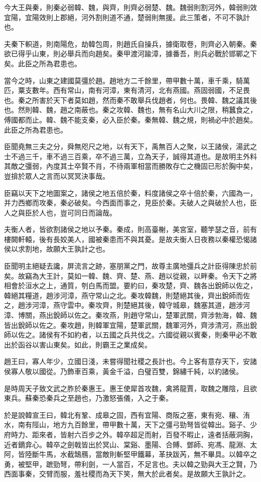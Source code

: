 今大王與秦，則秦必弱韓、魏，與齊，則齊必弱楚、魏。魏弱則割河外，韓弱則效宜陽，宜陽效則上郡絕，河外割則道不通，楚弱則無援。此三策者，不可不孰計也。

夫秦下軹道，則南陽危，劫韓包周，則趙氏自操兵，據衛取卷，則齊必入朝秦。秦欲已得乎山東，則必舉兵而向趙矣。秦甲渡河踰漳，據番吾，則兵必戰於邯鄲之下矣。此臣之所為君患也。

當今之時，山東之建國莫彊於趙。趙地方二千餘里，帶甲數十萬，車千乘，騎萬匹，粟支數年。西有常山，南有河漳，東有清河，北有燕國。燕固弱國，不足畏也。秦之所害於天下者莫如趙，然而秦不敢舉兵伐趙者，何也。畏韓、魏之議其後也。然則韓、魏，趙之南蔽也。秦之攻韓、魏也，無有名山大川之限，稍蠶食之，傅國都而止。韓、魏不能支秦，必入臣於秦。秦無韓、魏之規，則禍必中於趙矣。此臣之所為君患也。

臣聞堯無三夫之分，舜無咫尺之地，以有天下，禹無百人之聚，以王諸侯，湯武之士不過三千，車不過三百乘，卒不過三萬，立為天子，誠得其道也。是故明主外料其敵之彊弱，內度其士卒賢不肖，不待兩軍相當而勝敗存亡之機固已形於胸中矣，豈揜於眾人之言而以冥冥決事哉。

臣竊以天下之地圖案之，諸侯之地五倍於秦，料度諸侯之卒十倍於秦，六國為一，并力西鄉而攻秦，秦必破矣。今西面而事之，見臣於秦。夫破人之與破於人也，臣人之與臣於人也，豈可同日而論哉。

夫衡人者，皆欲割諸侯之地以予秦。秦成，則高臺榭，美宮室，聽竽瑟之音，前有樓闕軒轅，後有長姣美人，國被秦患而不與其憂。是故夫衡人日夜務以秦權恐愒諸侯以求割地，故願大王孰計之也。

臣聞明主絕疑去讒，屏流言之跡，塞朋黨之門，故尊主廣地彊兵之計臣得陳忠於前矣。故竊為大王計，莫如一韓、魏、齊、楚、燕、趙以從親，以畔秦。令天下之將相會於洹水之上，通質，刳白馬而盟。要約曰，秦攻楚，齊、魏各出銳師以佐之，韓絕其糧道，趙涉河漳，燕守常山之北。秦攻韓魏，則楚絕其後，齊出銳師而佐之，趙涉河漳，燕守雲中。秦攻齊，則楚絕其後，韓守城皋，魏塞其道，趙涉河漳、博關，燕出銳師以佐之。秦攻燕，則趙守常山，楚軍武關，齊涉勃海，韓、魏皆出銳師以佐之。秦攻趙，則韓軍宜陽，楚軍武關，魏軍河外，齊涉清河，燕出銳師以佐之。諸侯有不如約者，以五國之兵共伐之。六國從親以賓秦，則秦甲必不敢出於函谷以害山東矣。如此，則霸王之業成矣。

趙王曰，寡人年少，立國日淺，未嘗得聞社稷之長計也。今上客有意存天下，安諸侯寡人敬以國從。乃飾車百乘，黃金千溢，白璧百雙，錦繡千純，以約諸侯。

是時周天子致文武之胙於秦惠王。惠王使犀首攻魏，禽將龍賈，取魏之雕陰，且欲東兵。蘇秦恐秦兵之至趙也，乃激怒張儀，入之于秦。

於是說韓宣王曰，韓北有鞏、成皋之固，西有宜陽、商阪之塞，東有宛、穰、洧水，南有陘山，地方九百餘里，帶甲數十萬，天下之彊弓勁弩皆從韓出。谿子、少府時力、距來者，皆射六百步之外。韓卒超足而射，百發不暇止，遠者括蔽洞胸，近者鏑弇心。韓卒之劍戟皆出於冥山、棠谿、墨陽、合賻、鄧師、宛馮、龍淵、太阿，皆陸斷牛馬，水截鵠鴈，當敵則斬堅甲鐵幕，革抉跋芮，無不畢具。以韓卒之勇，被堅甲，蹠勁弩，帶利劍，一人當百，不足言也。夫以韓之勁與大王之賢，乃西面事秦，交臂而服，羞社稷而為天下笑，無大於此者矣。是故願大王孰計之。

